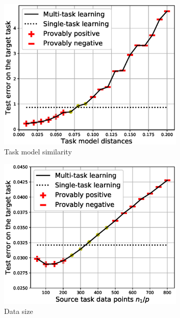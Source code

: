 \begin{figure}
	\begin{subfigure}[b]{0.32\textwidth}
		\centering
		\includegraphics[width=0.98\textwidth]{figures/model_shift_phase_transition.eps}
		\caption{Task model similarity}
		\label{fig_model_shift}
	\end{subfigure}\hfill
	\begin{subfigure}[b]{0.32\textwidth}
		\centering
		\includegraphics[width=0.98\textwidth]{figures/datapoints_phase_transition.eps}
		\caption{Data size}
	\end{subfigure}\hfill
	\begin{subfigure}[b]{0.32\textwidth}

\end{subfigure}
\end{figure}
